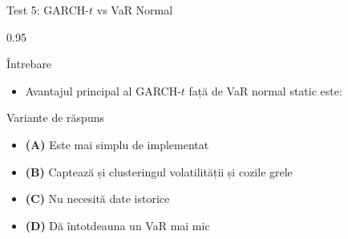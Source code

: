 \documentclass[9pt, aspectratio=169, t]{beamer}
\begin{document}
\begin{frame}{Test 5: GARCH-$t$ vs VaR Normal}
    \begin{cminipage}{0.95\textwidth}
    \begin{alertblock}{Întrebare}
        \begin{itemize}\setlength{\itemsep}{0pt}
            \item Avantajul principal al GARCH-$t$ față de VaR normal static este:
        \end{itemize}
    \end{alertblock}

    \begin{block}{Variante de răspuns}
    \begin{itemize}\setlength{\itemsep}{0pt}
        \item \textcolor{MainBlue}{\textbf{(A)}} Este mai simplu de implementat
        \item \textcolor{MainBlue}{\textbf{(B)}} Captează și clusteringul volatilității și cozile grele
        \item \textcolor{MainBlue}{\textbf{(C)}} Nu necesită date istorice
        \item \textcolor{MainBlue}{\textbf{(D)}} Dă întotdeauna un VaR mai mic
    \end{itemize}
    \end{block}
    \end{cminipage}
\end{frame}
\end{document}
